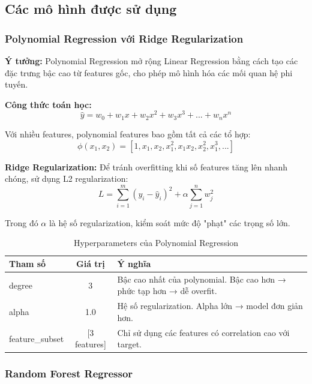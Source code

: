 \documentclass[12pt,a4paper]{article}
\begin{document}
\subsection{Các mô hình được sử dụng}

\subsubsection{Polynomial Regression với Ridge Regularization}

\textbf{Ý tưởng:} Polynomial Regression mở rộng Linear Regression bằng cách tạo các đặc trưng bậc cao từ features gốc, cho phép mô hình hóa các mối quan hệ phi tuyến.

\textbf{Công thức toán học:}
\begin{equation}
\hat{y} = w_0 + w_1 x + w_2 x^2 + w_3 x^3 + ... + w_n x^n
\end{equation}

Với nhiều features, polynomial features bao gồm tất cả các tổ hợp:
\begin{equation}
\phi(x_1, x_2) = [1, x_1, x_2, x_1^2, x_1 x_2, x_2^2, x_1^3, ...]
\end{equation}

\textbf{Ridge Regularization:} Để tránh overfitting khi số features tăng lên nhanh chóng, sử dụng L2 regularization:
\begin{equation}
L = \sum_{i=1}^{m} (y_i - \hat{y}_i)^2 + \alpha \sum_{j=1}^{n} w_j^2
\end{equation}

Trong đó $\alpha$ là hệ số regularization, kiểm soát mức độ "phạt" các trọng số lớn.

\begin{table}[H]
\centering
\caption{Hyperparameters của Polynomial Regression}
\begin{tabular}{|l|c|p{7cm}|}
\hline
\textbf{Tham số} & \textbf{Giá trị} & \textbf{Ý nghĩa} \\
\hline
degree & 3 & Bậc cao nhất của polynomial. Bậc cao hơn → phức tạp hơn → dễ overfit. \\
\hline
alpha & 1.0 & Hệ số regularization. Alpha lớn → model đơn giản hơn. \\
\hline
feature\_subset & [3 features] & Chỉ sử dụng các features có correlation cao với target. \\
\hline
\end{tabular}
\end{table}

\subsubsection{Random Forest Regressor}
\end{document}
